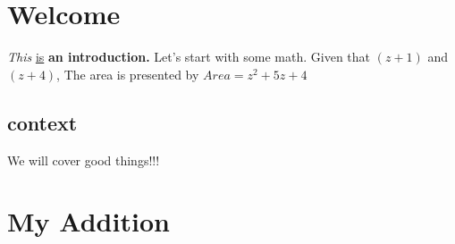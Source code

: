 \documentclass[11pt]{article}
\begin{document}
\section {Welcome}
\textit{This} \underline{is} \textbf{an introduction.}
Let's start with some math. Given that $(z+1)$ and $(z+4)$,
The area is presented by $Area=z^2+5z+4$
\subsection[10]{context} We will cover good things!!!
\section{My Addition}
\end{document}
